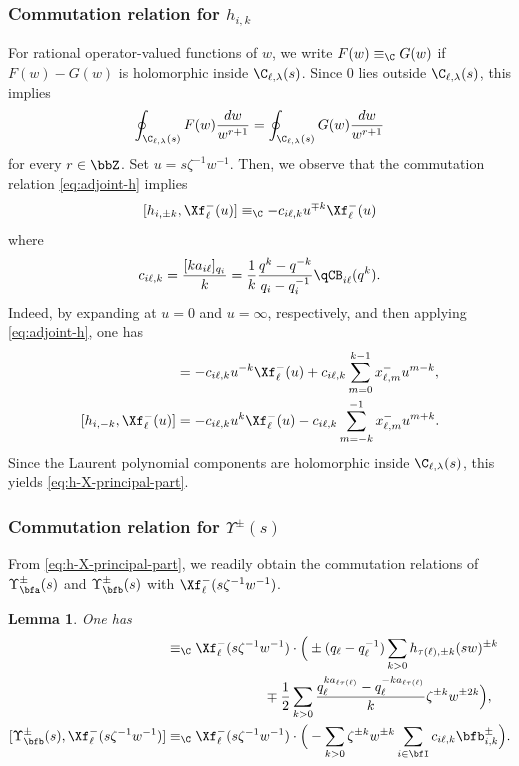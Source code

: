\documentclass[reqno]{amsart}
\numberwithin{equation}{section}
\newtheorem*{lemma}{Lemma}
\begin{document}
\subsubsection{Commutation relation for $h_{i,k}$}\label{sss:bK0-int-2}
For rational operator-valued functions of $w$, we write
$F(w)\equiv_\C G(w)$ if $F(w)-G(w)$ is holomorphic inside
$\C_{\ell,\lambda}(s)$. Since $0$ lies outside $\C_{\ell,\lambda}(s)$, this
implies
\begin{equation}\label{eq:Gamma-equivalence-moments}
\oint_{\C_{\ell,\lambda}(s)} F(w)\frac{dw}{w^{r+1}}
=
\oint_{\C_{\ell,\lambda}(s)} G(w)\frac{dw}{w^{r+1}}
\end{equation}
for every $r\in\bbZ$. Set $u=s\zeta^{-1}w^{-1}$. Then, we observe that the commutation relation 
\eqref{eq:adjoint-h} implies
\begin{equation}\label{eq:h-X-principal-part}
[h_{i,\pm k},\Xf^-_\ell(u)]
\equiv_{\C}
-c_{i\ell,k}u^{\mp k}\Xf^-_\ell(u)
\end{equation}
where
\begin{equation}
c_{i\ell,k}=\frac{[ka_{i\ell}]_{q_i}}{k}
=\frac{1}{k}\frac{q^k-q^{-k}}{q_i-q_i^{-1}}\qCB_{i\ell}(q^k).
\end{equation}
Indeed, by expanding at $u=0$ and
$u=\infty$, respectively, and then applying \eqref{eq:adjoint-h}, one has
\begin{align}
[h_{i,k},\Xf^-_\ell(u)]
&=
-c_{i\ell,k}u^{-k}\Xf^-_\ell(u)
+c_{i\ell,k}\sum_{m=0}^{k-1}x^-_{\ell,m}u^{m-k},
\label{eq:h-X-boundary-plus}\\
[h_{i,-k},\Xf^-_\ell(u)]
&=
-c_{i\ell,k}u^k\Xf^-_\ell(u)
-c_{i\ell,k}\sum_{m=-k}^{-1}x^-_{\ell,m}u^{m+k}.
\label{eq:h-X-boundary-minus}
\end{align}
Since the Laurent polynomial components are holomorphic inside $\C_{\ell,\lambda}(s)$,
this yields \eqref{eq:h-X-principal-part}.

\subsubsection{Commutation relation for $\Upsilon^\pm(s)$}\label{sss:bK0-int-3}

From \eqref{eq:h-X-principal-part}, we readily obtain the commutation relations of $\Upsilon^\pm_{\bfa}(s)$ and $\Upsilon^\pm_{\bfb}(s)$ with $\Xf^-_\ell(s\zeta^{-1}w^{-1})$.

\begin{lemma}\label{lem:comm-Upsilon}
One has
\begin{align}
[\Upsilon_{\bfa}^\pm(s),\Xf^-_\ell(s\zeta^{-1}w^{-1})]
&\equiv_{\C}\Xf^-_\ell(s\zeta^{-1}w^{-1})\cdot
\Big(
\pm(q_\ell-q_\ell^{-1})
\sum_{k>0}h_{\tau(\ell),\pm k}(sw)^{\pm k}\\
&\hspace{2.5cm}\mp\frac{1}{2}
\sum_{k>0}
\frac{q_\ell^{ka_{\ell\tau(\ell)}}
-q_\ell^{-ka_{\ell\tau(\ell)}}}{k}
\zeta^{\pm k}w^{\pm2k}\Big),\\
[\Upsilon_{\bfb}^\pm(s),\Xf^-_\ell(s\zeta^{-1}w^{-1})]
&\equiv_{\C}\Xf^-_\ell(s\zeta^{-1}w^{-1})\cdot\Big(
-\sum_{k>0}\zeta^{\pm k}w^{\pm k}
\sum_{i\in\bfI}c_{i\ell,k}\bfb_{i,k}^\pm
\Big).
\end{align}
\end{lemma}
\end{document}
